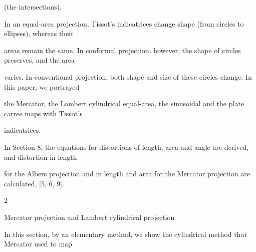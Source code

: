 \documentclass[a4paper,portrait,12pt]{article}
\begin{document}
\begin{flushleft}
(the intersections).
\end{flushleft}


\begin{flushleft}
In an equal-area projection, Tissot's indicatrices change shape (from circles to ellipses), whereas their
\end{flushleft}


\begin{flushleft}
areas remain the same. In conformal projection, however, the shape of circles preserves, and the area
\end{flushleft}


\begin{flushleft}
varies. In conventional projection, both shape and size of these circles change. In this paper, we portrayed
\end{flushleft}


\begin{flushleft}
the Mercator, the Lambert cylindrical equal-area, the sinusoidal and the plate carree maps with Tissot's
\end{flushleft}


\begin{flushleft}
indicatrices.
\end{flushleft}


\begin{flushleft}
In Section 8, the equations for distortions of length, area and angle are derived, and distortion in length
\end{flushleft}


\begin{flushleft}
for the Albers projection and in length and area for the Mercator projection are calculated, [5, 6, 9].
\end{flushleft}





2










\begin{flushleft}
Mercator projection and Lambert cylindrical projection
\end{flushleft}





\begin{flushleft}
In this section, by an elementary method, we show the cylindrical method that Mercator used to map
\end{flushleft}
\end{document}
